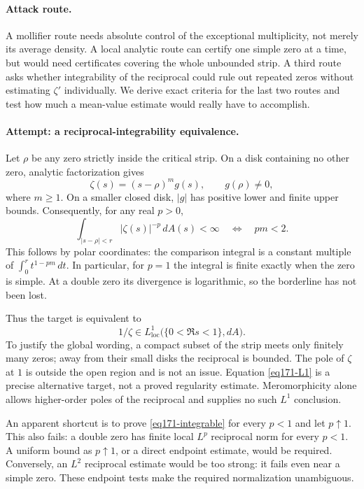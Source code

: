 \documentclass[11pt,a4paper]{article}
\numberwithin{equation}{section}
\begin{document}
\paragraph{Attack route.}
A mollifier route needs absolute control of the exceptional multiplicity,
not merely its average density. A local analytic route can certify one
simple zero at a time, but would need certificates covering the whole
unbounded strip. A third route asks whether integrability of the reciprocal
could rule out repeated zeros without estimating $\zeta'$ individually.
We derive exact criteria for the last two routes and test how much a
mean-value estimate would really have to accomplish.

\paragraph{Attempt: a reciprocal-integrability equivalence.}
Let $\rho$ be any zero strictly inside the critical strip. On a disk
containing no other zero, analytic factorization gives
\[
 \zeta(s)=(s-\rho)^m g(s),\qquad g(\rho)\ne0,
\]
where $m\ge1$. On a smaller closed disk, $|g|$ has positive lower and finite
upper bounds. Consequently, for any real $p>0$,
\begin{equation}\label{eq171-integrable}
 \int_{|s-\rho|<r}|\zeta(s)|^{-p}\,dA(s)<\infty
             \quad\Longleftrightarrow\quad pm<2.
\end{equation}
This follows by polar coordinates: the comparison integral is a constant
multiple of $\int_0^r t^{1-pm}\,dt$. In particular, for $p=1$ the integral
is finite exactly when the zero is simple. At a double zero its divergence
is logarithmic, so the borderline has not been lost.

Thus the target is equivalent to
\begin{equation}\label{eq171-L1}
       1/\zeta\in L^1_{\mathrm{loc}}\bigl(\{0<\Re s<1\},dA\bigr).
\end{equation}
To justify the global wording, a compact subset of the strip meets only
finitely many zeros; away from their small disks the reciprocal is bounded.
The pole of $\zeta$ at $1$ is outside the open region and is not an issue.
Equation \eqref{eq171-L1} is a precise alternative target, not a proved
regularity estimate. Meromorphicity alone allows higher-order poles of the
reciprocal and supplies no such $L^1$ conclusion.

An apparent shortcut is to prove \eqref{eq171-integrable} for every
$p<1$ and let $p\uparrow1$. This also fails: a double zero has finite
local $L^p$ reciprocal norm for every $p<1$. A uniform bound as $p\uparrow1$,
or a direct endpoint estimate, would be required. Conversely, an $L^2$
reciprocal estimate would be too strong: it fails even near a simple zero.
These endpoint tests make the required normalization unambiguous.
\end{document}
